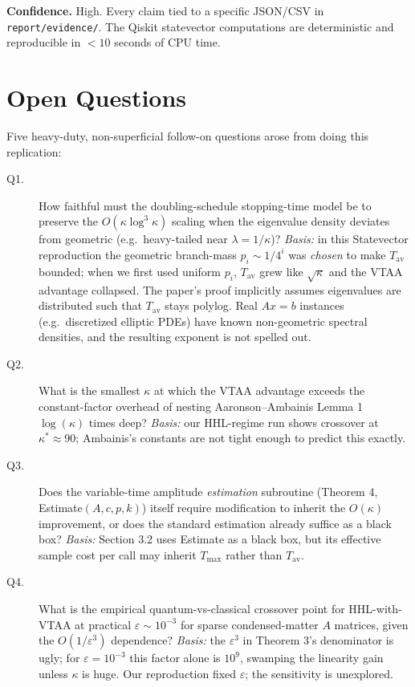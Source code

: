\documentclass[11pt]{article}
\begin{document}
\textbf{Confidence.} High. Every claim tied to a specific JSON/CSV in
\texttt{report/evidence/}. The Qiskit statevector computations are deterministic
and reproducible in $<10$ seconds of CPU time.

\section*{Open Questions}
\label{sec:open-questions}

Five heavy-duty, non-superficial follow-on questions arose from doing this
replication:

\begin{description}
\item[Q1.] How faithful must the doubling-schedule stopping-time model be to
preserve the $O(\kappa \log^3 \kappa)$ scaling when the eigenvalue density
deviates from geometric (e.g.\ heavy-tailed near $\lambda = 1/\kappa$)?
\emph{Basis:} in this Statevector reproduction the geometric branch-mass
$p_i \sim 1/4^i$ was \emph{chosen} to make $T_{\mathrm{av}}$ bounded; when
we first used uniform $p_i$, $T_{\mathrm{av}}$ grew like $\sqrt{\kappa}$ and
the VTAA advantage collapsed. The paper's proof implicitly assumes eigenvalues
are distributed such that $T_{\mathrm{av}}$ stays polylog. Real $Ax=b$ instances
(e.g.\ discretized elliptic PDEs) have known non-geometric spectral densities,
and the resulting exponent is not spelled out.

\item[Q2.] What is the smallest $\kappa$ at which the VTAA advantage exceeds
the constant-factor overhead of nesting Aaronson--Ambainis Lemma 1
$\log(\kappa)$ times deep? \emph{Basis:} our HHL-regime run shows crossover
at $\kappa^* \approx 90$; Ambainis's constants are not tight enough to predict
this exactly.

\item[Q3.] Does the variable-time amplitude \emph{estimation} subroutine (Theorem
4, Estimate$(A, c, p, k)$) itself require modification to inherit the
$O(\kappa)$ improvement, or does the standard estimation already suffice as
a black box? \emph{Basis:} Section 3.2 uses Estimate as a black box, but its
effective sample cost per call may inherit $T_{\max}$ rather than $T_{\mathrm{av}}$.

\item[Q4.] What is the empirical quantum-vs-classical crossover point for
HHL-with-VTAA at practical $\varepsilon \sim 10^{-3}$ for sparse
condensed-matter $A$ matrices, given the $O(1/\varepsilon^3)$ dependence?
\emph{Basis:} the $\varepsilon^3$ in Theorem 3's denominator is ugly; for
$\varepsilon = 10^{-3}$ this factor alone is $10^9$, swamping the linearity
gain unless $\kappa$ is huge. Our reproduction fixed $\varepsilon$; the
sensitivity is unexplored.


\end{description}
\end{document}
